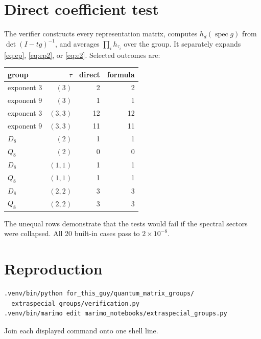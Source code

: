 \documentclass[11pt]{article}
\begin{document}
\section{Direct coefficient test}
The verifier constructs every representation matrix, computes
$h_d(\operatorname{spec}g)$ from $\det(I-tg)^{-1}$, and averages
$\prod_i h_{\tau_i}$ over the group.  It separately expands
\eqref{eq:ep}, \eqref{eq:ep2}, or \eqref{eq:e2}.  Selected outcomes are:
\begin{center}
\begin{tabular}{@{}lrrr@{}}\toprule
group & $\tau$ & direct & formula\\\midrule
exponent $3$ & $(3)$&2&2\\
exponent $9$ & $(3)$&1&1\\
exponent $3$ & $(3,3)$&12&12\\
exponent $9$ & $(3,3)$&11&11\\
$D_8$ & $(2)$&1&1\\
$Q_8$ & $(2)$&0&0\\
$D_8$ & $(1,1)$&1&1\\
$Q_8$ & $(1,1)$&1&1\\
$D_8$ & $(2,2)$&3&3\\
$Q_8$ & $(2,2)$&3&3\\\bottomrule
\end{tabular}
\end{center}
The unequal rows demonstrate that the tests would fail if the spectral
sectors were collapsed.  All 20 built-in cases pass to $2\times10^{-8}$.

\section{Reproduction}
\begin{verbatim}
.venv/bin/python for_this_guy/quantum_matrix_groups/
  extraspecial_groups/verification.py
.venv/bin/marimo edit marimo_notebooks/extraspecial_groups.py
\end{verbatim}
Join each displayed command onto one shell line.
\end{document}
